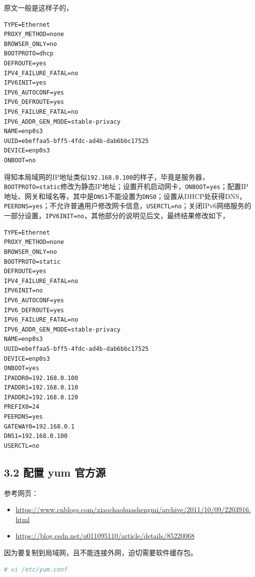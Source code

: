 \documentclass[doctor,openright,twoside]{sjtuthesis}
\providecommand{\tightlist}{%
    \setlength{\itemsep}{0pt}\setlength{\parskip}{0pt}}
\newcommand{\passthrough}[1]{#1}
\theoremstyle{plain}
\theoremstyle{definition}
\theoremstyle{remark}
\theoremstyle{ocrenumbox}
\theoremstyle{plain}
\begin{document}
原文一般是这样子的，

\begin{lstlisting}
TYPE=Ethernet
PROXY_METHOD=none
BROWSER_ONLY=no
BOOTPROTO=dhcp
DEFROUTE=yes
IPV4_FAILURE_FATAL=no
IPV6INIT=yes
IPV6_AUTOCONF=yes
IPV6_DEFROUTE=yes
IPV6_FAILURE_FATAL=no
IPV6_ADDR_GEN_MODE=stable-privacy
NAME=enp0s3
UUID=ebeffaa5-bff5-4fdc-ad4b-dab6bbc17525
DEVICE=enp0s3
ONBOOT=no
\end{lstlisting}

得知本局域网的IP地址类似\passthrough{\lstinline!192.168.0.100!}的样子，毕竟是服务器，\passthrough{\lstinline!BOOTPROTO=static!}修改为静态IP地址；设置开机启动网卡，\passthrough{\lstinline!ONBOOT=yes!}；配置IP地址、网关和域名等，其中是\passthrough{\lstinline!DNS1!}不能设置为\passthrough{\lstinline!DNS0!}；设置从DHCP处获得DNS，\passthrough{\lstinline!PEERDNS=yes!}；不允许普通用户修改网卡信息，\passthrough{\lstinline!USERCTL=no!}；关闭IPv6网络服务的一部分设置，\passthrough{\lstinline!IPV6INIT=no!}，其他部分的说明见后文，最终结果修改如下，

\begin{lstlisting}
TYPE=Ethernet
PROXY_METHOD=none
BROWSER_ONLY=no
BOOTPROTO=static
DEFROUTE=yes
IPV4_FAILURE_FATAL=no
IPV6INIT=no
IPV6_AUTOCONF=yes
IPV6_DEFROUTE=yes
IPV6_FAILURE_FATAL=no
IPV6_ADDR_GEN_MODE=stable-privacy
NAME=enp0s3
UUID=ebeffaa5-bff5-4fdc-ad4b-dab6bbc17525
DEVICE=enp0s3
ONBOOT=yes
IPADDR0=192.168.0.100
IPADDR1=192.168.0.110
IPADDR2=192.168.0.120
PREFIX0=24
PEERDNS=yes
GATEWAY0=192.168.0.1
DNS1=192.168.0.100
USERCTL=no
\end{lstlisting}

\hypertarget{yum-}{%
\subsection{3.2 配置 yum 官方源}\label{yum-}}

参考网页：

\begin{itemize}
\tightlist
\item
  \url{https://www.cnblogs.com/xiaochaohuashengmi/archive/2011/10/09/2203916.html}
\item
  \url{https://blog.csdn.net/u011095110/article/details/85220068}
\end{itemize}

因为要复制到局域网，且不能连接外网，迫切需要软件缓存包。

\begin{lstlisting}[language=bash]
# vi /etc/yum.conf
\end{lstlisting}
\end{document}
